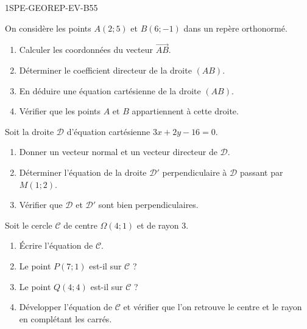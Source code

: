 \begin{evaluation}{1SPE-GEOREP-EV-B}{55}



On considère les points $A(2 ; 5)$ et $B(6 ; -1)$ dans un repère orthonormé.

\begin{enumerate}
  \item Calculer les coordonnées du vecteur $\vec{AB}$.
  \item Déterminer le coefficient directeur de la droite $(AB)$.
  \item En déduire une équation cartésienne de la droite $(AB)$.
  \item Vérifier que les points $A$ et $B$ appartiennent à cette droite.
\end{enumerate}



Soit la droite $\mathcal{D}$ d'équation cartésienne $3x + 2y - 16 = 0$.

\begin{enumerate}
  \item Donner un vecteur normal et un vecteur directeur de $\mathcal{D}$.
  \item Déterminer l'équation de la droite $\mathcal{D}'$ perpendiculaire à $\mathcal{D}$ passant par $M(1 ; 2)$.
  \item Vérifier que $\mathcal{D}$ et $\mathcal{D}'$ sont bien perpendiculaires.
\end{enumerate}



Soit le cercle $\mathcal{C}$ de centre $\Omega(4 ; 1)$ et de rayon $3$.

\begin{enumerate}
  \item Écrire l'équation de $\mathcal{C}$.
  \item Le point $P(7 ; 1)$ est-il sur $\mathcal{C}$ ?
  \item Le point $Q(4 ; 4)$ est-il sur $\mathcal{C}$ ?
  \item Développer l'équation de $\mathcal{C}$ et vérifier que l'on retrouve le centre et le rayon en complétant les carrés.
\end{enumerate}


\end{evaluation}
